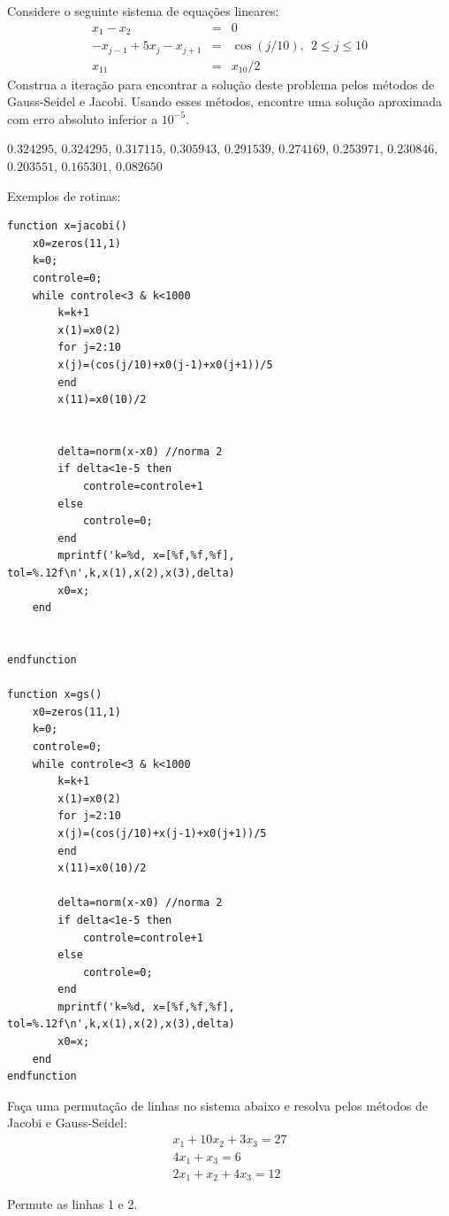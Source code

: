 \begin{exer} Considere o seguinte sistema de equações lineares:
\begin{eqnarray}
x_1-x_2&=&0\nonumber\\
-x_{j-1}+5x_j-x_{j+1}&=&\cos(j/10),~~ 2\leq j \leq 10\nonumber\\
x_{11}&=&x_{10}/2
\end{eqnarray}
Construa a iteração para encontrar a solução deste problema pelos métodos de Gauss-Seidel e Jacobi. Usando esses métodos, encontre uma solução aproximada com erro absoluto inferior a $10^{-5}$.
\end{exer}
\begin{resp}
  
$0.324295$, $0.324295$, $0.317115$, $0.305943$, $0.291539$, $0.274169$, $0.253971$, $0.230846$, $0.203551$, $0.165301$, $0.082650$

\ifisscilab
Exemplos de rotinas:
\begin{verbatim}
function x=jacobi()
    x0=zeros(11,1)
    k=0;
    controle=0;
    while controle<3 & k<1000
        k=k+1
        x(1)=x0(2)
        for j=2:10
        x(j)=(cos(j/10)+x0(j-1)+x0(j+1))/5
        end
        x(11)=x0(10)/2


        delta=norm(x-x0) //norma 2
        if delta<1e-5 then
            controle=controle+1
        else
            controle=0;
        end
        mprintf('k=%d, x=[%f,%f,%f], tol=%.12f\n',k,x(1),x(2),x(3),delta)
        x0=x;
    end


endfunction

function x=gs()
    x0=zeros(11,1)
    k=0;
    controle=0;
    while controle<3 & k<1000
        k=k+1
        x(1)=x0(2)
        for j=2:10
        x(j)=(cos(j/10)+x(j-1)+x0(j+1))/5
        end
        x(11)=x0(10)/2

        delta=norm(x-x0) //norma 2
        if delta<1e-5 then
            controle=controle+1
        else
            controle=0;
        end
        mprintf('k=%d, x=[%f,%f,%f], tol=%.12f\n',k,x(1),x(2),x(3),delta)
        x0=x;
    end
endfunction
\end{verbatim}    
\fi
  
\end{resp}

\begin{exer} Faça uma permutação de linhas no sistema abaixo e resolva pelos métodos de Jacobi e Gauss-Seidel:
\begin{eqnarray*}
x_1+10x_2+3x_3=27\\
4x_1+x_3=6\\
2x_1+x_2+4x_3=12
\end{eqnarray*}
\end{exer}
\begin{resp}
  
    Permute as linhas 1 e 2.    
  
\end{resp}


